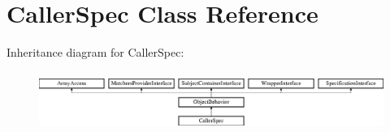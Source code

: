 \section{Caller\+Spec Class Reference}
\label{classspec_1_1_php_spec_1_1_wrapper_1_1_subject_1_1_caller_spec}
Inheritance diagram for Caller\+Spec\+:\begin{figure}[H]
\begin{center}
\leavevmode
\includegraphics[height=1.953488cm]{classspec_1_1_php_spec_1_1_wrapper_1_1_subject_1_1_caller_spec}
\end{center}
\end{figure}
